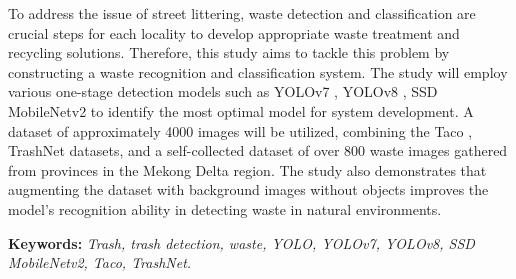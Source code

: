 \documentclass[./thesis.tex]{subfiles}
\begin{document}

{\fontsize{13}{12} \selectfont
To address the issue of street littering, waste detection and classification are crucial steps for each locality to develop appropriate waste treatment and recycling solutions.
Therefore, this study aims to tackle this problem by constructing a waste recognition and classification system. The study will employ various one-stage detection models such as YOLOv7 \cite{wang2022yolov7}, YOLOv8 \cite{YOLOv8}, SSD MobileNetv2 \cite{Liu_2016} \cite{sandler2019mobilenetv2} to identify the most optimal model for system development.
A dataset of approximately 4000 images will be utilized, combining the Taco \cite{proença2020taco}, TrashNet \cite{yang2016classification} datasets, and a self-collected dataset of over 800 waste images gathered from provinces in the Mekong Delta region.
The study also demonstrates that augmenting the dataset with background images without objects improves the model's recognition ability in detecting waste in natural environments.

}
\bigskip

{\bf Keywords:} \textit{Trash, trash detection, waste, YOLO, YOLOv7, YOLOv8, SSD MobileNetv2, Taco, TrashNet.}
\end{document}
